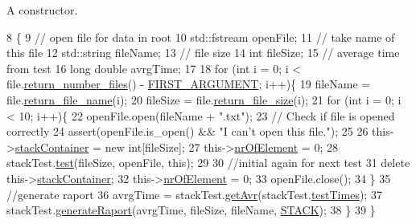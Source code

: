 A constructor. 


\begin{DoxyCode}
8                                                   \{
9     \textcolor{comment}{// open file for data in root}
10     std::fstream openFile;
11     \textcolor{comment}{// take name of this file}
12     std::string fileName;
13     \textcolor{comment}{// file size}
14     \textcolor{keywordtype}{int} fileSize;
15     \textcolor{comment}{// average time from test}
16     \textcolor{keywordtype}{long} \textcolor{keywordtype}{double} avrgTime;
17 
18     \textcolor{keywordflow}{for} (\textcolor{keywordtype}{int} i = 0; i < file.\hyperlink{class_input_files_a3db5accd81913e0b89fdd3b4650c8923}{return\_number\_files}() - 
      \hyperlink{inputfile__txt_8h_ac6795aca310766e1b10d90013aac6d47}{FIRST\_ARGUMENT}; i++)\{
19         fileName = file.\hyperlink{class_input_files_a9246bc217efcfa1569478bcf44e1cd20}{return\_file\_name}(i);
20         fileSize = file.\hyperlink{class_input_files_a9c65bfcc0e684642c40c999959d6d014}{return\_file\_size}(i);
21         \textcolor{keywordflow}{for} (\textcolor{keywordtype}{int} i = 0; i < 10; i++)\{
22             openFile.open(fileName + \textcolor{stringliteral}{".txt"});
23             \textcolor{comment}{// Check if file is opened correctly}
24             assert(openFile.is\_open() && \textcolor{stringliteral}{"I can't open this file."});
25             
26             this->\hyperlink{class_stack_aa14462f08b194e58a777a3390c0ebb31}{stackContainer} = \textcolor{keyword}{new} \textcolor{keywordtype}{int}[fileSize];
27             this->\hyperlink{class_stack_a59b3d0f6dad7a0c6c131a87a765a9687}{nrOfElement} = 0;
28             stackTest.\hyperlink{class_benchmark_a4107fff4e0da31d561fc6109e359b341}{test}(fileSize, openFile, \textcolor{keyword}{this});
29 
30             \textcolor{comment}{//initial again for next test}
31             \textcolor{keyword}{delete} this->\hyperlink{class_stack_aa14462f08b194e58a777a3390c0ebb31}{stackContainer};
32             this->\hyperlink{class_stack_a59b3d0f6dad7a0c6c131a87a765a9687}{nrOfElement} = 0;
33             openFile.close();
34         \}
35         \textcolor{comment}{//generate raport}
36         avrgTime = stackTest.\hyperlink{class_benchmark_a3efa1ec3d4e76eb0fa1633dda265c711}{getAvr}(stackTest.\hyperlink{class_benchmark_a5563f218941d6b01ac7783f1e6582025}{testTimes});
37         stackTest.\hyperlink{class_benchmark_abf697c20cfadd6d084cd32bc2c9f6c9f}{generateRaport}(avrgTime, fileSize, fileName, 
      \hyperlink{benchmark__frm_8h_ac2ad7f431e3446fddcd9b6b9f93c4c14a3bfeb3e4822bcc96abf42601a42bbcd3}{STACK});
38     \}
39 \}
\end{DoxyCode}


